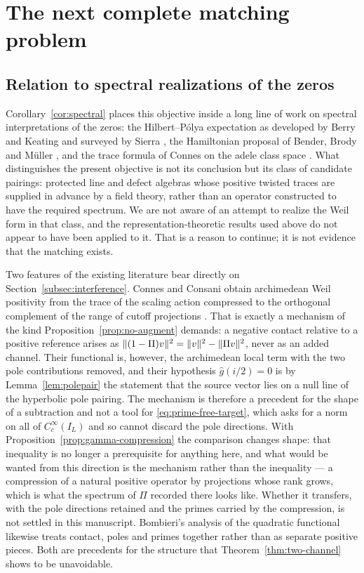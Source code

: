 \section{The next complete matching problem}\label{sec:outlook}
\subsection{Relation to spectral realizations of the zeros}
Corollary~\ref{cor:spectral} places this objective inside a long line of work
on spectral interpretations of the zeros: the Hilbert--P\'olya expectation as
developed by Berry and Keating \cite{BerryKeating} and surveyed by Sierra
\cite{Sierra}, the Hamiltonian proposal of Bender, Brody and M\"uller
\cite{BBM}, and the trace formula of Connes on the adele class space
\cite{ConnesTrace,CCM}. What distinguishes the present objective is not its
conclusion but its class of candidate pairings: protected line and defect
algebras whose positive twisted traces are supplied in advance by a field
theory, rather than an operator constructed to have the required spectrum.
We are not aware of an attempt to realize the Weil form in that class, and
the representation-theoretic results used above
\cite{Sphere,Schur,RG,EKRS,Klyuev} do not appear to have been applied to it.
That is a reason to continue; it is not evidence that the matching exists.

Two features of the existing literature bear directly on
Section~\ref{subsec:interference}. Connes and Consani obtain archimedean Weil
positivity from the trace of the scaling action compressed to the orthogonal
complement of the range of cutoff projections \cite{CCWeil}. That is exactly
a mechanism of the kind Proposition~\ref{prop:no-augment} demands: a negative
contact relative to a positive reference arises as
$\lVert (1-\Pi)v\rVert^2=\lVert v\rVert^2-\lVert \Pi v\rVert^2$, never as an added channel.
Their functional is, however, the archimedean local term with the two pole
contributions removed, and their hypothesis $\widehat g(i/2)=0$ is by
Lemma~\ref{lem:polepair} the statement that the source vector lies on a null
line of the hyperbolic pole pairing. The mechanism is therefore a precedent
for the shape of a subtraction and not a tool for \eqref{eq:prime-free-target},
which asks for a norm on all of $C_c^\infty(I_L)$ and so cannot discard the
pole directions. With Proposition~\ref{prop:gamma-compression} the comparison
changes shape: that inequality is no longer a prerequisite for anything here,
and what would be wanted from this direction is the mechanism rather than the
inequality --- a compression of a natural positive operator by projections
whose rank grows, which is what the spectrum of $\Pi$ recorded there looks
like. Whether it transfers, with the pole directions retained and the primes
carried by the compression, is not settled in this manuscript.
Bombieri's analysis of the quadratic functional
\cite{Bombieri} likewise treats contact, poles and primes together rather than
as separate positive pieces. Both are precedents for the structure that
Theorem~\ref{thm:two-channel} shows to be unavoidable.

